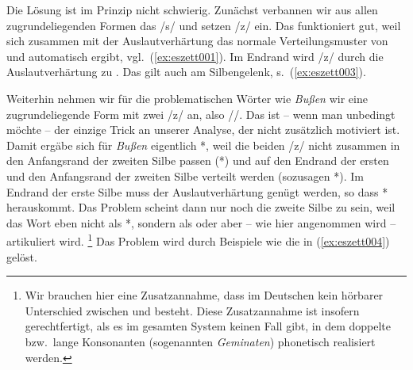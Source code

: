 Die Lösung ist im Prinzip nicht schwierig.
Zunächst verbannen wir aus allen zugrundeliegenden Formen das /s/ und setzen /z/ ein.
Das funktioniert gut, weil sich zusammen mit der Auslautverhärtung das normale Verteilungsmuster von \textipa{[s]} und \textipa{[z]} automatisch ergibt, vgl.\ (\ref{ex:eszett001}).
Im Endrand wird /z/ durch die Auslautverhärtung zu \textipa{[s]}.
Das gilt auch am Silbengelenk, s.\ (\ref{ex:eszett003}).

\begin{exe}
\end{exe}

Weiterhin nehmen wir für die problematischen Wörter wie \textit{Bußen} wir eine zugrundeliegende Form mit zwei /z/ an, also //.
Das ist -- wenn man unbedingt möchte -- der einzige Trick an unserer Analyse, der nicht zusätzlich motiviert ist.
Damit ergäbe sich für \textit{Bußen} eigentlich *\textipa{[bu:s.z@n]}, weil die beiden /z/ nicht zusammen in den Anfangsrand der zweiten Silbe passen (*\textipa{[zz@n]}) und auf den Endrand der ersten und den Anfangsrand der zweiten Silbe verteilt werden (sozusagen *\textipa{[bu:z.z@n]}).
Im Endrand der erste Silbe muss der Auslautverhärtung genügt werden, so dass *\textipa{[bu:s.z@n]} herauskommt.
Das Problem scheint dann nur noch die zweite Silbe zu sein, weil das Wort eben nicht als *\textipa{[bu:s.z@n]}, sondern als \textipa{[bu:.s@n]} oder aber -- wie hier angenommen wird -- \textipa{[bu:s.sen]} artikuliert wird.%
\footnote{Wir brauchen hier eine Zusatzannahme, dass im Deutschen kein hörbarer Unterschied zwischen \textipa{[bu:s.s@n]} und \textipa{[bu:.s@n]} besteht.
Diese Zusatzannahme ist insofern gerechtfertigt, als es im gesamten System keinen Fall gibt, in dem doppelte bzw.\ lange Konsonanten (sogenannten \textit{Geminaten}) phonetisch realisiert werden.}
Das Problem wird durch Beispiele wie die in (\ref{ex:eszett004}) gelöst.

